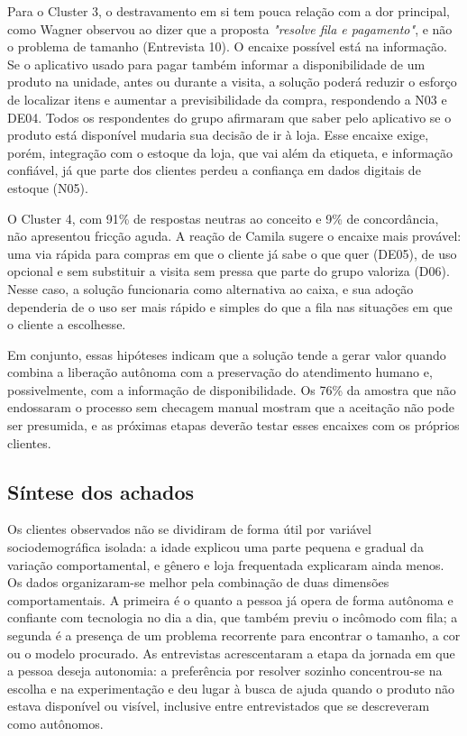 Para o Cluster 3, o destravamento em si tem pouca relação com a dor principal, como Wagner observou ao dizer que a proposta \emph{"resolve fila e pagamento"}, e não o problema de tamanho (Entrevista 10). O encaixe possível está na informação. Se o aplicativo usado para pagar também informar a disponibilidade de um produto na unidade, antes ou durante a visita, a solução poderá reduzir o esforço de localizar itens e aumentar a previsibilidade da compra, respondendo a N03 e DE04. Todos os respondentes do grupo afirmaram que saber pelo aplicativo se o produto está disponível mudaria sua decisão de ir à loja. Esse encaixe exige, porém, integração com o estoque da loja, que vai além da etiqueta, e informação confiável, já que parte dos clientes perdeu a confiança em dados digitais de estoque (N05).

O Cluster 4, com 91\% de respostas neutras ao conceito e 9\% de concordância, não apresentou fricção aguda. A reação de Camila sugere o encaixe mais provável: uma via rápida para compras em que o cliente já sabe o que quer (DE05), de uso opcional e sem substituir a visita sem pressa que parte do grupo valoriza (D06). Nesse caso, a solução funcionaria como alternativa ao caixa, e sua adoção dependeria de o uso ser mais rápido e simples do que a fila nas situações em que o cliente a escolhesse.

Em conjunto, essas hipóteses indicam que a solução tende a gerar valor quando combina a liberação autônoma com a preservação do atendimento humano e, possivelmente, com a informação de disponibilidade. Os 76\% da amostra que não endossaram o processo sem checagem manual mostram que a aceitação não pode ser presumida, e as próximas etapas deverão testar esses encaixes com os próprios clientes.

\subsection{Síntese dos achados}
\label{sec:sintese}

Os clientes observados não se dividiram de forma útil por variável sociodemográfica isolada: a idade explicou uma parte pequena e gradual da variação comportamental, e gênero e loja frequentada explicaram ainda menos. Os dados organizaram-se melhor pela combinação de duas dimensões comportamentais. A primeira é o quanto a pessoa já opera de forma autônoma e confiante com tecnologia no dia a dia, que também previu o incômodo com fila; a segunda é a presença de um problema recorrente para encontrar o tamanho, a cor ou o modelo procurado. As entrevistas acrescentaram a etapa da jornada em que a pessoa deseja autonomia: a preferência por resolver sozinho concentrou-se na escolha e na experimentação e deu lugar à busca de ajuda quando o produto não estava disponível ou visível, inclusive entre entrevistados que se descreveram como autônomos.

